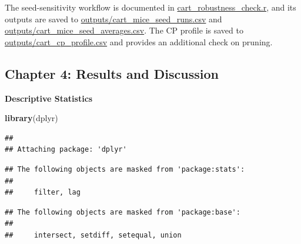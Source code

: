 \documentclass[
]{article}
\newenvironment{Shaded}{\begin{snugshade}}{\end{snugshade}}
\newcommand{\FunctionTok}[1]{\textcolor[rgb]{0.13,0.29,0.53}{\textbf{#1}}}
\newcommand{\NormalTok}[1]{#1}
\begin{document}
The seed-sensitivity workflow is documented in
\url{cart_robustness_check.r}, and its outputs are saved to
\url{outputs/cart_mice_seed_runs.csv} and
\url{outputs/cart_mice_seed_averages.csv}. The CP profile is saved to
\url{outputs/cart_cp_profile.csv} and provides an additional check on
pruning.

\subsection{Chapter 4: Results and
Discussion}\label{chapter-4-results-and-discussion}

\textbf{Descriptive Statistics}

\begin{Shaded}
\begin{Highlighting}[]
\FunctionTok{library}\NormalTok{(dplyr)}
\end{Highlighting}
\end{Shaded}

\begin{verbatim}
## 
## Attaching package: 'dplyr'
\end{verbatim}

\begin{verbatim}
## The following objects are masked from 'package:stats':
## 
##     filter, lag
\end{verbatim}

\begin{verbatim}
## The following objects are masked from 'package:base':
## 
##     intersect, setdiff, setequal, union
\end{verbatim}
\end{document}
